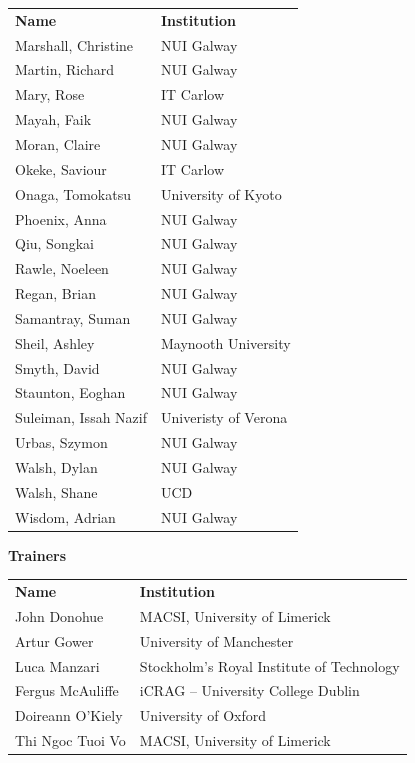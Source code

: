\documentclass[a4paper, 11pt]{article}
\begin{document}
\begin{small}
\begin{minipage}[t]{0.1\textwidth}
\end{minipage} 
%
\begin{minipage}[t]{0.45\textwidth}
\begin{tabular}{l l}
\textbf{Name}&\textbf{Institution}\\
 	Marshall, Christine &	NUI Galway\\
Martin, Richard &	NUI Galway\\
Mary,	Rose &	IT Carlow\\
  Mayah, Faik &	NUI Galway\\
Moran,	Claire &	NUI Galway\\
  Okeke,	Saviour &	IT Carlow\\
  Onaga,	Tomokatsu & University  of Kyoto \\
Phoenix, 	Anna &	NUI Galway\\
Qiu,	Songkai &	NUI Galway\\
Rawle, 	Noeleen &	NUI Galway\\
Regan,	Brian &	NUI Galway\\
Samantray, Suman &	NUI Galway\\
Sheil,	Ashley &	Maynooth University\\
Smyth,	David &	NUI Galway\\
Staunton, Eoghan &	NUI Galway\\
Suleiman, Issah Nazif  &	Univeristy of Verona\\
Urbas, Szymon &	NUI Galway\\
Walsh,	Dylan &	NUI Galway\\
Walsh,	Shane &	UCD\\
Wisdom,	Adrian & 	NUI Galway\\
\end{tabular}
\end{minipage}
\end{small}
\vspace{10pt}


\vspace{1cm}


{\textbf{\huge Trainers}}\\

\begin{minipage}[t]{0.45\textwidth}
\begin{tabular}{l l}
\textbf{Name}&\textbf{Institution}\\
John Donohue & MACSI, University of Limerick\\
Artur Gower & University of Manchester\\
Luca Manzari & Stockholm's Royal Institute of Technology\\
Fergus McAuliffe & iCRAG -- University College Dublin\\
Doireann O'Kiely & University of Oxford\\
Thi Ngoc Tuoi Vo & MACSI, University of Limerick
\end{tabular}
\end{minipage}
\end{document}
